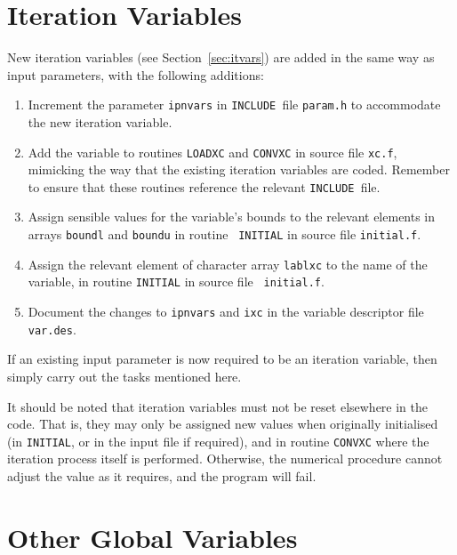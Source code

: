 \documentclass[11pt,a4paper]{report}
\newcommand{\INCLUDE}{\mbox{\tt INCLUDE }}
\begin{document}
\section{Iteration Variables}

New iteration variables (see Section~\ref{sec:itvars}) are added in the
same way as input parameters, with the following additions:
\begin{enumerate}
\item
Increment the parameter {\tt ipnvars} in \INCLUDE file {\tt param.h}
to accommodate the new iteration variable.
\item
Add the variable to routines {\tt LOADXC} and {\tt CONVXC} in source
file {\tt xc.f}, mimicking the way that the existing iteration
variables are coded. Remember to ensure that these routines reference
the relevant \INCLUDE file.
\item
Assign sensible values for the variable's bounds to the relevant
elements in arrays {\tt boundl} and {\tt boundu} in routine {\tt
INITIAL} in source file {\tt initial.f}.
\item
Assign the relevant element of character array {\tt lablxc} to the
name of the variable, in routine {\tt INITIAL} in source file {\tt
initial.f}.
\item
Document the changes to {\tt ipnvars} and {\tt ixc} in the variable
descriptor file {\tt var.des}.
\end{enumerate}
If an existing input parameter is now required to be an iteration
variable, then simply carry out the tasks mentioned here.

It should be noted that iteration variables must not be reset elsewhere in the
code. That is, they may only be assigned new values when originally
initialised (in {\tt INITIAL}, or in the input file if required), and in
routine {\tt CONVXC} where the iteration process itself is performed.
Otherwise, the numerical procedure cannot adjust the value as it requires, and
the program will fail.

\section{Other Global Variables}
\end{document}
